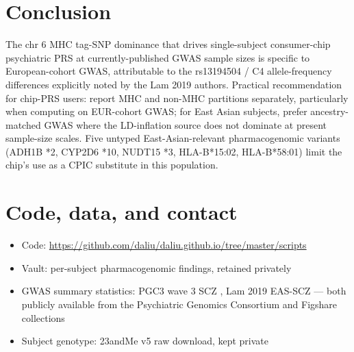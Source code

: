 \documentclass[11pt,a4paper]{article}
\begin{document}
\section{Conclusion}

The chr 6 MHC tag-SNP dominance that drives single-subject consumer-chip psychiatric PRS at currently-published GWAS sample sizes is specific to European-cohort GWAS, attributable to the rs13194504 / C4 allele-frequency differences explicitly noted by the Lam 2019 authors. Practical recommendation for chip-PRS users: report MHC and non-MHC partitions separately, particularly when computing on EUR-cohort GWAS; for East Asian subjects, prefer ancestry-matched GWAS where the LD-inflation source does not dominate at present sample-size scales. Five untyped East-Asian-relevant pharmacogenomic variants (ADH1B *2, CYP2D6 *10, NUDT15 *3, HLA-B*15:02, HLA-B*58:01) limit the chip's use as a CPIC substitute in this population.

\section*{Code, data, and contact}

\begin{itemize}
\item Code: \url{https://github.com/daliu/daliu.github.io/tree/master/scripts}
\item Vault: per-subject pharmacogenomic findings, retained privately
\item GWAS summary statistics: PGC3 wave 3 SCZ \cite{trubetskoy2022}, Lam 2019 EAS-SCZ \cite{lam2019} --- both publicly available from the Psychiatric Genomics Consortium and Figshare collections
\item Subject genotype: 23andMe v5 raw download, kept private
\end{itemize}
\end{document}
